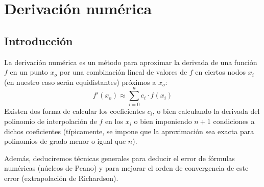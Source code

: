     
       \chapter{Derivaci{\'o}n num{\'e}rica} 
        \section{Introducción}
        La derivación numérica es un método para aproximar la derivada de una función $f$ en un punto $x_o$ por una combinación lineal de valores de $f$ en ciertos nodos $x_i$ (en nuestro caso serán equidistantes) próximos a $x_o$:
        $$f'(x_o)\approx\sum_{i=0}^n c_i\cdot f(x_i)$$
        Existen dos forma de calcular los coeficientes $c_i$, o bien calculando la derivada del polinomio de interpolación de $f$ en los $x_i$ o bien imponiendo $n+1$ condiciones a dichos coeficientes (típicamente, se impone que la aproximación sea exacta para polinomios de grado menor o igual que $n$).
        
        Además, deduciremos técnicas generales para deducir el error de fórmulas numéricas (núcleos de Peano) y para mejorar el orden de convergencia de este error (extrapolación de Richardson).
